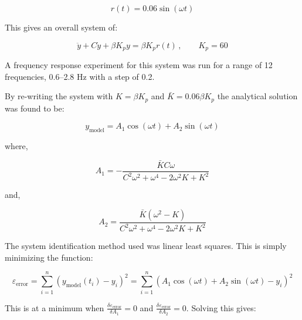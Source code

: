 \lessspace

\begin{equation}\label{proportional-controller}
r\left(t\right) = 0.06 \sin\left(\omega t\right)
\end{equation}

This gives an overall system of:

\lesspace

\begin{equation}
\ddot{y} + C \dot{y} + \beta K_p y = \beta K_p r\left(t\right) \, , \qquad K_p = 60
\end{equation}

A frequency response experiment for this system was run for a range of 12
frequencies, 0.6--2.8 Hz with a step of 0.2.

By re-writing the system with $K = \beta K_p$ and $\bar{K} = 0.06 \beta K_p$ the
analytical solution was found to be:

\lessspace

\begin{equation}\label{y_model}
y_\text{model} = A_1 \cos\left(\omega t\right) + A_2 \sin\left(\omega t\right)
\end{equation}

where, 

\lessspace

\begin{equation}\label{a1}
A_1 = - \frac{\bar{K} C \omega}{C^2 \omega^2 + \omega^4 - 2 \omega^2 K + K^2}
\end{equation}

and,

\lessspace

\begin{equation}\label{a2}
A_2 = \frac{\bar{K} \left(\omega^2 - K\right)}{C^2 \omega^2 + \omega^4 - 2 \omega^2 K + K^2}
\end{equation}

The system identification method used was linear least squares.  This is simply
minimizing the function:

\lesspace

\begin{equation}
\varepsilon_\text{error} = \sum^{n}_{i = 1} \left(
y_\text{model}\left(t_i\right)-y_i\right)^2 = \sum^{n}_{i = 1} \left( A_1
\cos\left(\omega t\right) + A_2 \sin\left(\omega t\right) - y_i\right)^2
\end{equation}

This is at a minimum when $\frac{\delta \varepsilon_\text{error}}{\delta A_1} =
0$ and $\frac{\delta \varepsilon_\text{error}}{\delta A_2} = 0$.  Solving this
gives:

